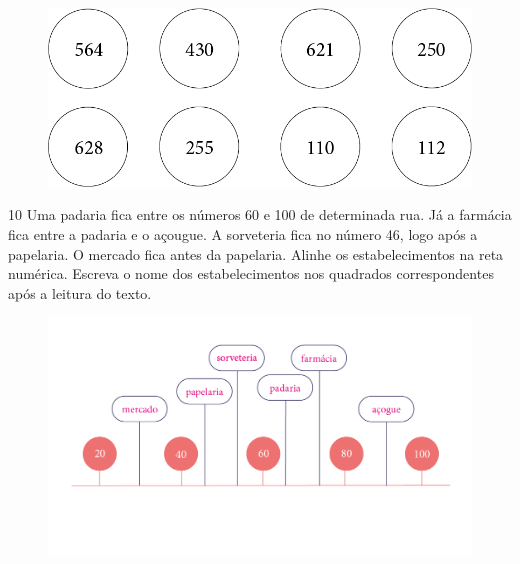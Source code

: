 \begin{figure}[htpb!]
\includegraphics[width=\textwidth]{./media/image12.png}
\end{figure}


\pagebreak
\num{10} Uma padaria fica entre os números 60 e 100 de determinada rua. Já a farmácia fica entre a padaria e o açougue. A sorveteria fica no número 46, logo após a papelaria. O mercado fica antes da papelaria.
Alinhe os estabelecimentos na reta numérica. Escreva o nome dos
estabelecimentos nos quadrados correspondentes após a leitura do texto.

\begin{figure}[htpb!]
\centering
\includegraphics[width=+1.09\textwidth]{./media/image14_prof.png}
\end{figure}




